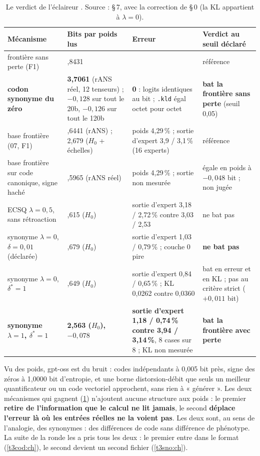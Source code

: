 \begin{table}[tbp]
\centering\small
\begin{tabularx}{\linewidth}{>{\raggedright\arraybackslash}p{3.3cm} >{\raggedright\arraybackslash}p{2.6cm} >{\raggedright\arraybackslash}X >{\raggedright\arraybackslash}p{2.6cm}}
\toprule
Mécanisme & Bits par poids lus & Erreur & Verdict au seuil déclaré \\
\midrule
frontière sans perte (F1) & 3,8431 & 0 & référence \\
\textbf{codon synonyme du zéro} & \textbf{3,7061} (rANS réel, 12 tenseurs) ; $-0{,}128$ sur tout le 20b, $-0{,}126$ sur tout le 120b & \textbf{0} : logits identiques au bit ; \texttt{.kld} égal octet pour octet & \textbf{bat la frontière sans perte} (seuil 0,05) \\
base frontière (07, F1) & 2,6441 (rANS) ; 2,679 ($H_0$ + échelles) & poids 4,29\,\% ; sortie d'expert 3,9 / 3,1\,\% (16 experts) & référence \\
base frontière sur code canonique, signe haché & 2,5965 (rANS réel) & poids 4,29\,\% ; sortie non mesurée & égale en poids à $-0{,}048$ bit ; non jugée \\
ECSQ $\lambda = 0{,}5$, sans rétroaction & 2,615 ($H_0$) & sortie d'expert 3,18 / 2,72\,\% contre 3,03 / 2,53 & ne bat pas \\
synonyme $\lambda = 0$, $\delta = 0{,}01$ (déclarée) & 2,679 ($H_0$) & sortie d'expert 1,03 / 0,79\,\% ; couche 0 pire & \textbf{ne bat pas} \\
synonyme $\lambda = 0$, $\delta^\ast = 1$ & 2,649 ($H_0$) & sortie d'expert 0,84 / 0,65\,\% ; KL 0,0262 contre 0,0360 & bat en erreur et en KL ; pas au critère strict ($+0{,}011$ bit) \\
\textbf{synonyme $\lambda = 1$, $\delta^\ast = 1$} & \textbf{2,563 ($H_0$), $-0{,}078$} & \textbf{sortie d'expert 1,18 / 0,74\,\% contre 3,94 / 3,14\,\%}, 8 cases sur 8 ; KL non mesurée & \textbf{bat la frontière avec perte} \\
\bottomrule
\end{tabularx}
\caption[Le verdict de l'éclaireur]{Le verdict de l'éclaireur \mes. Source :  §\,7, avec la correction de  §\,0 (la KL appartient à $\lambda = 0$).}
\label{t3ecl:tab:verdict}
\end{table}

Vu des poids, gpt-oss est du bruit : codes indépendants à 0,005 bit près, signe des zéros à 1,0000 bit d'entropie, et une borne distorsion-débit que seuls un meilleur quantificateur ou un code vectoriel approchent, sans rien à « générer ». Les deux mécanismes qui gagnent (\cref{t3ecl:tab:verdict}) n'ajoutent aucune structure aux poids : le premier \textbf{retire de l'information que le calcul ne lit jamais}, le second \textbf{déplace l'erreur là où les entrées réelles ne la voient pas}. Les deux sont, au sens de l'analogie, des synonymes : des différences de code sans différence de phénotype. La suite de la ronde les a pris tous les deux : le premier entre dans le format (\cref{t3cod:ch}), le second devient un second fichier (\cref{t3sno:ch}).

